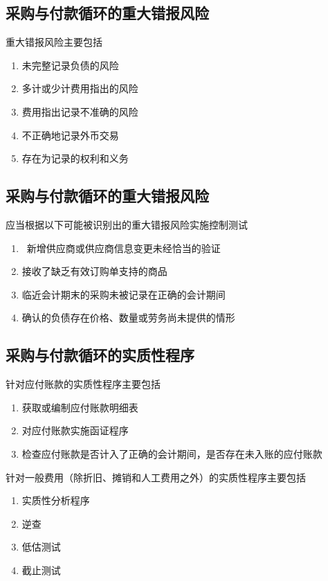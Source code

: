 \documentclass[UTF8,12pt]{ctexart}
\numberwithin{equation}{section} %
\numberwithin{figure}{section}
\numberwithin{table}{section}
\begin{document}
	\subsection{采购与付款循环的重大错报风险}
	重大错报风险主要包括
	\begin{enumerate}
		\item 未完整记录负债的风险
		
		\item 多计或少计费用指出的风险
		
		\item 费用指出记录不准确的风险
		
		\item 不正确地记录外币交易
		
		\item 存在为记录的权利和义务
		
	\end{enumerate}
	
	\subsection{采购与付款循环的重大错报风险}
	应当根据以下可能被识别出的重大错报风险实施控制测试
	\begin{enumerate}
		\item  新增供应商或供应商信息变更未经恰当的验证
		
		\item 接收了缺乏有效订购单支持的商品
		
		\item 临近会计期末的采购未被记录在正确的会计期间
		
		\item 确认的负债存在价格、数量或劳务尚未提供的情形
	\end{enumerate}
	
	\subsection{采购与付款循环的实质性程序}
	针对应付账款的实质性程序主要包括
	\begin{enumerate}
		\item 获取或编制应付账款明细表
		
		\item 对应付账款实施函证程序
		
		\item 检查应付账款是否计入了正确的会计期间，是否存在未入账的应付账款
	\end{enumerate}
	
	针对一般费用（除折旧、摊销和人工费用之外）的实质性程序主要包括
	\begin{enumerate}
		\item 实质性分析程序
		
		\item 逆查
		
		\item 低估测试
		
		\item 截止测试
	\end{enumerate}
	
\end{document}
